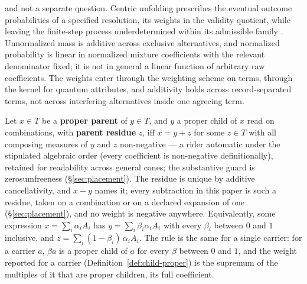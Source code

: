 and not a separate question. Centric unfolding prescribes the eventual outcome probabilities of a specified resolution, its weights in the validity quotient, while leaving the finite-step process underdetermined within its admissible family \cite{Aethus}. Unnormalized mass is additive across exclusive alternatives, and normalized probability is linear in normalized mixture coefficients with the relevant denominator fixed; it is not in general a linear function of arbitrary raw coefficients. The weights enter through the weighting scheme on terms, through the kernel for quantum attributes, and additivity holds across record-separated terms, not across interfering alternatives inside one agreeing term.

Let $x \in T$ be a \textbf{proper parent} of $y \in T$, and $y$ a proper child of $x$ read on combinations, with \textbf{parent residue} $z$, iff $x = y + z$ for some $z \in T$ with all composing measures of $y$ and $z$ non-negative --- a rider automatic under the stipulated algebraic order (every coefficient is non-negative definitionally), retained for readability across general cones; the substantive guard is zerosumfreeness (§\ref{sec:placement}). The residue is unique by additive cancellativity, and $x - y$ names it; every subtraction in this paper is such a residue, taken on a combination or on a declared expansion of one (§\ref{sec:placement}), and no weight is negative anywhere. Equivalently, some expression $x = \sum_i \alpha_i A_i$ has $y = \sum_i \beta_i \alpha_i A_i$ with every $\beta_i$ between $0$ and $1$ inclusive, and $z = \sum_i (1 - \beta_i)\,\alpha_i A_i$. The rule is the same for a single carrier: for a carrier $a$, $\beta a$ is a proper child of $a$ for every $\beta$ between $0$ and $1$, and the weight reported for a carrier (Definition~\ref{def:child-proper}) is the supremum of the multiples of it that are proper children, its full coefficient.

